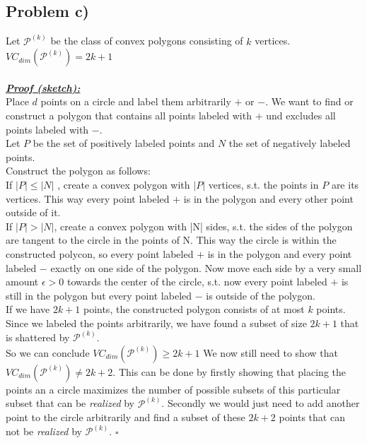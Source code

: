 \subsection*{Problem c)}
Let $\mathcal{P}^(k)$ be the class of convex polygons consisting of $k$ vertices.\\
$VC_{dim}(\mathcal{P}^(k)) = 2k+1$\\
\\
\textbf{\underline{\textit{Proof (sketch):}}}\\
Place $d$ points on a circle and label them arbitrarily $+$ or $-$.
We want to find or construct a polygon that contains all points labeled with $+$ und excludes all points labeled with $-$.\\
Let $P$ be the set of positively labeled points and $N$ the set of negatively labeled points.\\
Construct the polygon as follows:\\
If $|P|\leq |N|$ , create a convex polygon with $|P|$ vertices, s.t. the points in $P$ are its vertices. This way every point labeled $+$ is in the polygon and every other point outside of it.\\
If $|P|>|N|$, create a convex polygon with |N| sides, s.t. the sides of the polygon are tangent to the circle in the points of N. This way the circle is within the constructed polycon, so every point labeled $+$ is in the polygon and every point labeled $-$ exactly on one side of the polygon. Now move each side by a very small amount $\epsilon > 0$ towards the center of the circle, s.t. now every point labeled $+$ is still in the polygon but every point labeled $-$ is outside of the polygon.\\
If we have $2k+1$ points, the constructed polygon consists of at most $k$ points. Since we labeled the points arbitrarily, we have found a subset of size $2k+1$ that is shattered by $\mathcal{P}^(k)$.\\
So we can conclude $VC_{dim}(\mathcal{P}^(k)) \geq 2k+1$
We now still need to show that $VC_{dim}(\mathcal{P}^(k)) \neq 2k+2$.
This can be done by firstly showing that placing the points an a circle maximizes the number of possible subsets of this particular subset that can be \textit{realized} by $\mathcal{P}^(k)$. Secondly we would just need to add another point to the circle arbitrarily and find a subset of these $2k+2$ points that can not be \textit{realized} by $\mathcal{P}^(k)$.
\hfill$\square$